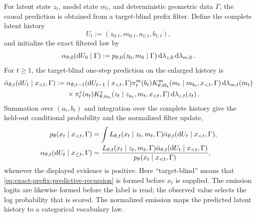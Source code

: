 For latent state $z_t$, model state $m_t$, and deterministic geometric data $\Gamma$, the causal prediction is obtained from a target-blind prefix filter. Define the complete latent history
\begin{equation}
U_t:=(z_{0:t},m_{0:t},a_{1:t},b_{1:t}),
\label{eq:prefix-latent-history}
\end{equation}
and initialize the exact filtered law by
\begin{equation}
\alpha_{\theta,0}(\mathop{\mathrm dU_0}\mid\Gamma)
:=p_{\theta,0}(z_0,m_0\mid\Gamma)
\mathop{\mathrm d\lambda_{z,0}}\mathop{\mathrm d\lambda_{m,0}}.
\label{eq:prefix-filter-initial-law}
\end{equation}
For $t\geq1$, the target-blind one-step prediction on the enlarged history is
\begin{equation}
\begin{aligned}
\bar\alpha_{\theta,t}(\mathop{\mathrm dU_t}\mid x_{<t},\Gamma)
:={}&\alpha_{\theta,t-1}(\mathop{\mathrm dU_{t-1}}\mid x_{<t},\Gamma)
\pi_t^m(b_t)
K^m_{\theta,tb_t}(m_t\mid m_{b_t},x_{<t},\Gamma)
\mathop{\mathrm d\lambda_{m,t}(m_t)}\\
&\times\pi_t^z(a_t)
K^z_{\theta,ta_t}(z_t\mid z_{a_t},m_t,x_{<t},\Gamma)
\mathop{\mathrm d\lambda_{z,t}(z_t)}.
\end{aligned}
\label{eq:exact-prefix-predictive-recursion}
\end{equation}
Summation over $(a_t,b_t)$ and integration over the complete history give the held-out conditional probability and the normalized filter update,
\begin{equation}
\begin{aligned}
p_\theta(x_t\mid x_{<t},\Gamma)
&=\int L_{\theta,t}(x_t\mid z_t,m_t,\Gamma)
\bar\alpha_{\theta,t}(\mathop{\mathrm dU_t}\mid x_{<t},\Gamma),\\
\alpha_{\theta,t}(\mathop{\mathrm dU_t}\mid x_{\leq t},\Gamma)
&=\frac{L_{\theta,t}(x_t\mid z_t,m_t,\Gamma)
\bar\alpha_{\theta,t}(\mathop{\mathrm dU_t}\mid x_{<t},\Gamma)}
{p_\theta(x_t\mid x_{<t},\Gamma)},
\end{aligned}
\label{eq:prior-predictive-token-law}
\end{equation}
whenever the displayed evidence is positive. Here ``target-blind'' means that \cref{eq:exact-prefix-predictive-recursion} is formed before $x_t$ is supplied. The emission logits are likewise formed before the label is read; the observed value selects the log probability that is scored. The normalized emission maps the predicted latent history to a categorical vocabulary law.

